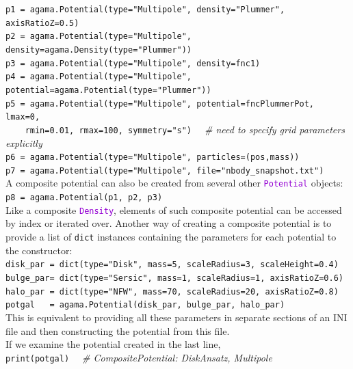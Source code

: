 \documentclass[12pt]{article}
\newcommand{\ttt}[1]{\textcolor{darkviolet}{\texttt{#1}}}
\begin{document}
\texttt{p1 = agama.Potential(type="Multipole", density="Plummer", axisRatioZ=0.5)}\\
\texttt{p2 = agama.Potential(type="Multipole", density=agama.Density(type="Plummer"))}\\
\texttt{p3 = agama.Potential(type="Multipole", density=fnc1)}\\
\texttt{p4 = agama.Potential(type="Multipole", potential=agama.Potential(type="Plummer"))}\\
\texttt{p5 = agama.Potential(type="Multipole", potential=fncPlummerPot, lmax=0, \\
\mbox{}~~~~rmin=0.01, rmax=100, symmetry="s")} \textit{\color{Sepia} \ \ \# need to specify grid parameters explicitly}\\
\texttt{p6 = agama.Potential(type="Multipole", particles=(pos,mass))}\\
\texttt{p7 = agama.Potential(type="Multipole", file="nbody_snapshot.txt")}\\[2mm]
A composite potential can also be created from several other \ttt{Potential} objects:\\
\texttt{p8 = agama.Potential(p1, p2, p3)}\\[2mm]
Like a composite \ttt{Density}, elements of such composite potential can be accessed by index or iterated over.
Another way of creating a composite potential is to provide a list of \texttt{dict} instances containing the parameters for each potential to the constructor:\\
\texttt{disk_par = dict(type="Disk", mass=5, scaleRadius=3, scaleHeight=0.4)}\\
\texttt{bulge_par= dict(type="Sersic", mass=1, scaleRadius=1, axisRatioZ=0.6)}\\
\texttt{halo_par = dict(type="NFW", mass=70, scaleRadius=20, axisRatioZ=0.8)}\\
\texttt{potgal~~~= agama.Potential(disk_par, bulge_par, halo_par)}\\
This is equivalent to providing all these parameters in separate sections of an INI file and then constructing the potential from this file.\\[2mm]
If we examine the potential created in the last line,\\
\texttt{print(potgal)}  \textit{\color{Sepia} \ \ \# CompositePotential: DiskAnsatz, Multipole}\\
\end{document}
